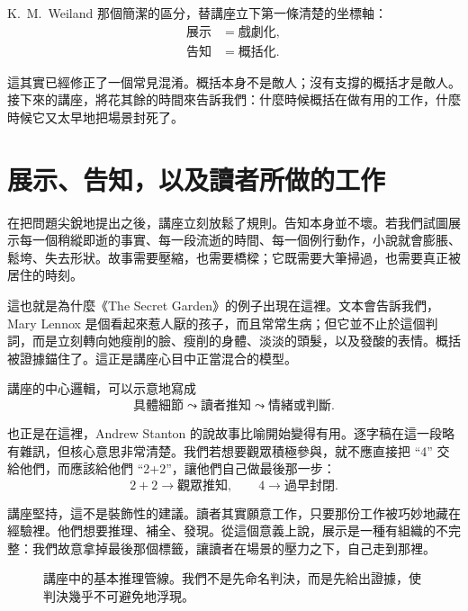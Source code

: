 K.\ M.\ Weiland 那個簡潔的區分，替講座立下第一條清楚的坐標軸：
\begin{align}
\text{展示} &= \text{戲劇化},\\
\text{告知} &= \text{概括化}.
\end{align}

這其實已經修正了一個常見混淆。概括本身不是敵人；沒有支撐的概括才是敵人。接下來的講座，將花其餘的時間來告訴我們：什麼時候概括在做有用的工作，什麼時候它又太早地把場景封死了。

\section{展示、告知，以及讀者所做的工作}

在把問題尖銳地提出之後，講座立刻放鬆了規則。告知本身並不壞。若我們試圖展示每一個稍縱即逝的事實、每一段流逝的時間、每一個例行動作，小說就會膨脹、鬆垮、失去形狀。故事需要壓縮，也需要橋樑；它既需要大筆掃過，也需要真正被居住的時刻。

這也就是為什麼《The Secret Garden》的例子出現在這裡。文本會告訴我們，Mary Lennox 是個看起來惹人厭的孩子，而且常常生病；但它並不止於這個判詞，而是立刻轉向她瘦削的臉、瘦削的身體、淡淡的頭髮，以及發酸的表情。概括被證據錨住了。這正是講座心目中正當混合的模型。

講座的中心邏輯，可以示意地寫成
\begin{equation}
\text{具體細節} \leadsto \text{讀者推知} \leadsto \text{情緒或判斷}.
\end{equation}

也正是在這裡，Andrew Stanton 的說故事比喻開始變得有用。逐字稿在這一段略有雜訊，但核心意思非常清楚。我們若想要觀眾積極參與，就不應直接把 ``4'' 交給他們，而應該給他們 ``2+2''，讓他們自己做最後那一步：
\begin{equation}
2+2 \to \text{觀眾推知}, \qquad 4 \to \text{過早封閉}.
\end{equation}

講座堅持，這不是裝飾性的建議。讀者其實願意工作，只要那份工作被巧妙地藏在經驗裡。他們想要推理、補全、發現。從這個意義上說，展示是一種有組織的不完整：我們故意拿掉最後那個標籤，讓讀者在場景的壓力之下，自己走到那裡。

\begin{figure}[h]
\centering
{}
\caption{講座中的基本推理管線。我們不是先命名判決，而是先給出證據，使判決幾乎不可避免地浮現。}
\end{figure}

